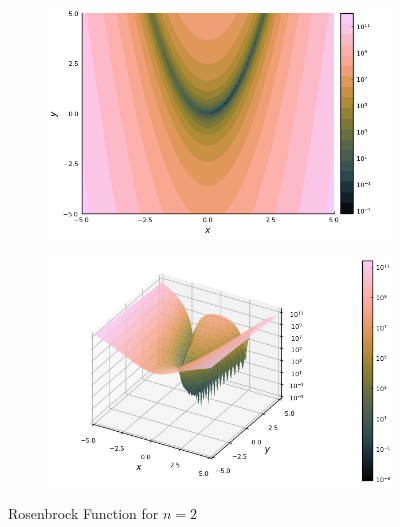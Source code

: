   \begin{figure}[ht!]
    \centering
    \begin{subfigure}[b]{0.4\textwidth}
      \centering
      \includegraphics[width=\textwidth]{img/test_functions/rosenbrock_contour.png}
    \end{subfigure}
    \begin{subfigure}[b]{0.4\textwidth}
      \centering
      \includegraphics[width=\textwidth]{img/test_functions/rosenbrock_surface.png}
    \end{subfigure}
    \caption{Rosenbrock Function for \(n = 2\)}
    \label{fig:rosenbrock_function}
  \end{figure}
